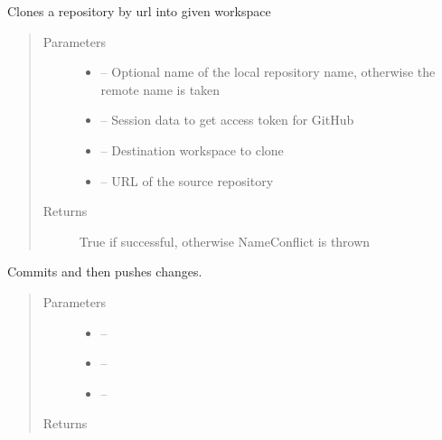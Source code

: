 \documentclass[letterpaper,10pt,english]{sphinxmanual}
\begin{document}
\begin{fulllineitems}
\label{_source/son_editor.impl:son_editor.impl.gitimpl.clone}
Clones a repository by url into given workspace
\begin{quote}\begin{description}
\item[{Parameters}] \leavevmode\begin{itemize}
\item {} 
 -- Optional name of the local repository name, otherwise the remote name is taken

\item {} 
 -- Session data to get access token for GitHub

\item {} 
 -- Destination workspace to clone

\item {} 
 -- URL of the source repository

\end{itemize}

\item[{Returns}] \leavevmode
True if successful, otherwise NameConflict is thrown

\end{description}\end{quote}

\end{fulllineitems}


\begin{fulllineitems}
\label{_source/son_editor.impl:son_editor.impl.gitimpl.commit_and_push}
Commits and then pushes changes.
\begin{quote}\begin{description}
\item[{Parameters}] \leavevmode\begin{itemize}
\item {} 
 -- 

\item {} 
 -- 

\item {} 
 -- 

\end{itemize}

\item[{Returns}] \leavevmode


\end{description}\end{quote}

\end{fulllineitems}
\end{document}
